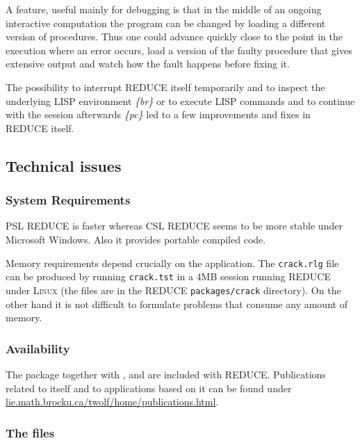 A feature, useful mainly for debugging is that in the middle of an
ongoing interactive computation the program can be changed by loading
a different version of  procedures.  Thus one could
advance quickly close to the point in the execution where an error
occurs, load a version of the faulty procedure that gives extensive
output and watch how the fault happens before fixing it.

The possibility to interrupt REDUCE itself temporarily and to inspect
the underlying LISP environment \emph{\{br\}} or to execute LISP
commands and to continue with the  session afterwards
\emph{\{pc\}} led to a few improvements and fixes in REDUCE itself.

\subsection{Technical issues}

\subsubsection{System Requirements}

PSL REDUCE is faster whereas CSL REDUCE seems to be more stable under
Microsoft Windows.  Also it provides portable compiled code.

Memory requirements depend crucially on the application.  The
\texttt{crack.rlg} file can be produced by running \texttt{crack.tst}
in a 4MB session running REDUCE under \textsc{Linux} (the files are in
the REDUCE \texttt{packages/crack} directory).  On the other hand it
is not difficult to formulate problems that consume any amount of
memory.

\subsubsection{Availability}

The package  together with ,
 and  are included with REDUCE\@.
Publications related to  itself and to applications
based on it can be found under
\href{https://lie.math.brocku.ca/twolf/home/publications.html}{
  lie.math.brocku.ca/twolf/home/publications.html}.

\subsubsection{The files}

